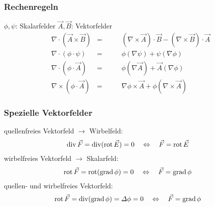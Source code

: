 \subsubsection{Rechenregeln}
$\phi, \psi$: Skalarfelder \qquad $\vec{A}, \vec{B}$: Vektorfelder
\begin{align*}
     & \nabla \cdot (\vec{A} \times \vec{B}) & = & \qquad (\nabla \times \vec{A})\cdot\vec{B} - (\nabla\times\vec{B})\cdot\vec{A} \\
     & \nabla \cdot (\phi \cdot \psi)        & = & \qquad \phi (\nabla \psi) + \psi( \nabla \phi)                                  \\
     & \nabla \cdot (\phi \cdot \vec{A})           & = & \qquad \phi (\nabla \vec{A}) + \vec{A}(\nabla \phi)                             \\
     & \nabla \times (\phi \cdot \vec{A})          & = & \qquad \nabla \phi \times \vec{A} + \phi (\nabla \times \vec{A})                        
\end{align*}

\subsubsection{Spezielle Vektorfelder}
quellenfreies Vektorfeld $\rightarrow$ Wirbelfeld:
\begin{align*}
\operatorname{div} \vec{F} = \operatorname{div} (\operatorname{rot} \vec{E}) = 0 \quad \Leftrightarrow \quad  \vec{F} = \operatorname{rot} \vec{E}
\end{align*}
wirbelfreies Vektorfeld $\rightarrow$ Skalarfeld: 
\begin{align*}
    \operatorname{rot} \vec{F} = \operatorname{rot} (\operatorname{grad} \phi) = 0 \quad \Leftrightarrow \quad  \vec{F} = \operatorname{grad} \phi
    \end{align*}
quellen- und wirbelfreies Vektorfeld:
\begin{align*}
    \operatorname{rot} \vec{F} = \operatorname{div} (\operatorname{grad} \phi) = \varDelta \phi = 0 \quad \Leftrightarrow \quad  \vec{F} = \operatorname{grad} \phi
\end{align*}



